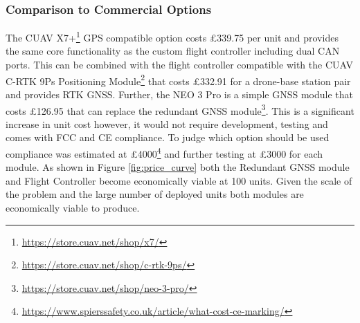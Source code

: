 \subsubsection{Comparison to Commercial Options}\label{sub_sub_section:tgt_commercial_options}

The CUAV X7+\footnote{\url{https://store.cuav.net/shop/x7/}} GPS compatible option costs £339.75 per unit and provides the same core functionality as the custom flight controller including dual \gls{CAN} ports. This can be combined with the flight controller compatible with the CUAV C-RTK 9Ps Positioning Module\footnote{\url{https://store.cuav.net/shop/c-rtk-9ps/}} that costs £332.91 for a drone-base station pair and provides \gls{RTK} \gls{GNSS}. Further, the NEO 3 Pro is a simple \gls{GNSS} module that costs £126.95 that can replace the redundant \gls{GNSS} module\footnote{\url{https://store.cuav.net/shop/neo-3-pro/}}. This is a significant increase in unit cost however, it would not require development, testing and comes with FCC and CE compliance. To judge which option should be used compliance was estimated at £4000\footnote{\url{https://www.spierssafety.co.uk/article/what-cost-ce-marking/}} and further testing at £3000 for each module. As shown in Figure \ref{fig:price_curve} both the Redundant \gls{GNSS} module and Flight Controller become economically viable at 100 units. Given the scale of the problem and the large number of deployed units both modules are economically viable to produce.